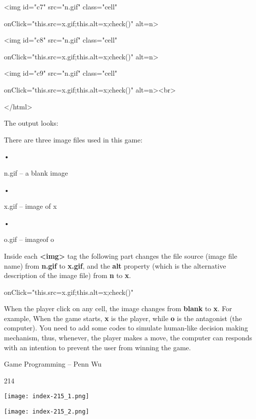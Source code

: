 \documentclass[
]{article}
\begin{document}
\textless img id="c7" src="n.gif" class="cell"

onClick="this.src=\textquotesingle x.gif\textquotesingle;this.alt=\textquotesingle x\textquotesingle;check()"
alt=\textquotesingle n\textquotesingle\textgreater{}

\textless img id="c8" src="n.gif" class="cell"

onClick="this.src=\textquotesingle x.gif\textquotesingle;this.alt=\textquotesingle x\textquotesingle;check()"
alt=\textquotesingle n\textquotesingle\textgreater{}

\textless img id="c9" src="n.gif" class="cell"

onClick="this.src=\textquotesingle x.gif\textquotesingle;this.alt=\textquotesingle x\textquotesingle;check()"
alt=\textquotesingle n\textquotesingle\textgreater\textless br\textgreater{}

\textless/html\textgreater{}

The output looks:

There are three image files used in this game:

•

n.gif -- a blank image

•

x.gif -- image of x

•

o.gif -- imageof o

Inside each \textbf{\textless img\textgreater{}} tag the following part
changes the file source (image file name) from \textbf{n.gif} to
\textbf{x.gif}, and the \textbf{alt} property (which is the alternative
description of the image file) from \textbf{n} to \textbf{x}.

onClick="this.src=\textquotesingle x.gif\textquotesingle;this.alt=\textquotesingle x\textquotesingle;check()"

When the player click on any cell, the image changes from \textbf{blank}
to \textbf{x}. For example, When the game starts, \textbf{x} is the
player, while \textbf{o} is the antagonist (the computer). You need to
add some codes to simulate human-like decision making mechanism, thus,
whenever, the player makes a move, the computer can responds with an
intention to prevent the user from winning the game.

Game Programming -- Penn Wu

214

\protect\hypertarget{index_split_011.htmlux5cux23p215}{}{}\texttt{[image: index-215\_1.png]}

\texttt{[image: index-215\_2.png]}
\end{document}
